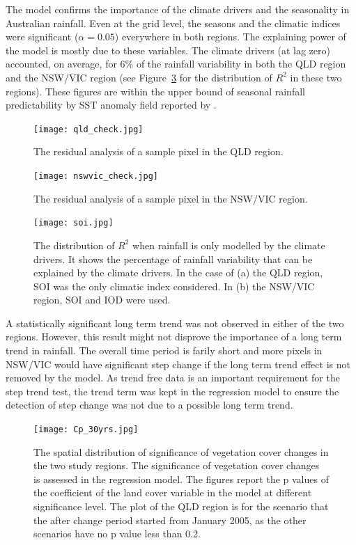 \documentclass[draft,linenumbers]{agujournal}
\begin{document}
\begin{article}
The model confirms the importance of the climate drivers and the seasonality in Australian rainfall. Even at the grid level, the seasons and the climatic indices were significant ($\alpha = 0.05$) everywhere in both regions. The explaining power of the model is mostly due to these variables. The climate drivers (at lag zero) accounted, on average, for 6\% of the rainfall variability in both the QLD region and the NSW/VIC region (see Figure~\ref{fig:rsq} for the distribution of $R^2$ in these two regions). These figures are within the upper bound of seasonal rainfall predictability by SST anomaly field reported by \citet{Westra2010}.

\begin{figure}[htp]
  \centering
  \texttt{[image: qld\_check.jpg]}
  \caption{The residual analysis of a sample pixel in the QLD region.}
  \label{fig:residuals_qld}
\end{figure}

\begin{figure}[htp]
  \centering
  \texttt{[image: nswvic\_check.jpg]}
  \caption{The residual analysis of a sample pixel in the NSW/VIC region.}
  \label{fig:residuals_nswvic}
\end{figure}

\begin{figure}[htp]
  \centering
  \texttt{[image: soi.jpg]}
  \caption{The distribution of $R^2$ when rainfall is only modelled by the climate drivers. It shows the percentage of rainfall variability that can be explained by the climate drivers. In the case of (a) the QLD region, SOI was the only climatic index considered. In (b) the NSW/VIC region, SOI and IOD were used.}
  \label{fig:rsq}
\end{figure}


A statistically significant long term trend was not observed in either of the two regions. However, this result might not disprove the importance of a long term trend in rainfall. The overall time period is farily short and more pixels in NSW/VIC would have significant step change if the long term trend effect is not removed by the model. As trend free data is an important requirement for the step trend test, the trend term was kept in the regression model to ensure the detection of step change was not due to a possible long term trend. 

\begin{figure}[htp]
\texttt{[image: Cp\_30yrs.jpg]}
  \caption{The spatial distribution of significance of vegetation cover changes in the two study regions. The significance of vegetation cover changes is assessed in the regression model. The figures report the p values of the coefficient of the land cover variable in the model at different significance level. The plot of the QLD region is for the scenario that the after change period started from January 2005, as the other scenarios have no p value less than 0.2.}
  \label{fig:LC_p}
\end{figure}


\end{article}
\end{document}
